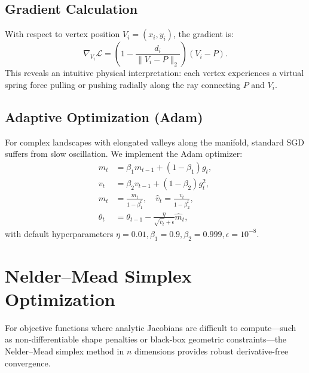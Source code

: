 \subsection{Gradient Calculation}
With respect to vertex position $V_i = (x_i, y_i)$, the gradient is:
\begin{equation}
\nabla_{V_i} \mathcal{L} = \left( 1 - \frac{d_i}{\|V_i - P\|_2} \right) (V_i - P).
\end{equation}
This reveals an intuitive physical interpretation: each vertex experiences a virtual spring force pulling or pushing radially along the ray connecting $P$ and $V_i$.

\subsection{Adaptive Optimization (Adam)}
For complex landscapes with elongated valleys along the manifold, standard SGD suffers from slow oscillation. We implement the Adam optimizer:
\begin{align}
m_t &= \beta_1 m_{t-1} + (1 - \beta_1) g_t, \\
v_t &= \beta_2 v_{t-1} + (1 - \beta_2) g_t^2, \\
\hat{m}_t &= \frac{m_t}{1 - \beta_1^t}, \quad \hat{v}_t = \frac{v_t}{1 - \beta_2^t}, \\
\theta_t &= \theta_{t-1} - \frac{\eta}{\sqrt{\hat{v}_t} + \epsilon} \hat{m}_t,
\end{align}
with default hyperparameters $\eta = 0.01, \beta_1 = 0.9, \beta_2 = 0.999, \epsilon = 10^{-8}$.

\section{Nelder--Mead Simplex Optimization}
For objective functions where analytic Jacobians are difficult to compute---such as non-differentiable shape penalties or black-box geometric constraints---the Nelder--Mead simplex method in $n$ dimensions provides robust derivative-free convergence.

